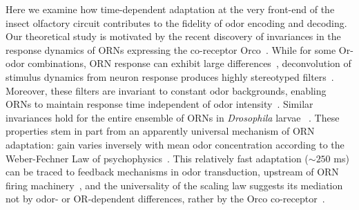 \documentclass[9pt,twocolumn,twoside,lineno]{pnas-new}
\begin{document}
Here we examine how time-dependent adaptation at the very front-end of the insect olfactory circuit contributes to the fidelity of odor encoding and decoding. Our theoretical study is motivated by the recent discovery of invariances in the response dynamics of ORNs expressing the co-receptor Orco~\cite{Orco, srinivas_elife, cafaro_WL, cao_WL}. While for some Or-odor combinations, ORN response can exhibit large differences~\cite{montague2011similar}, deconvolution of stimulus dynamics from neuron response produces highly stereotyped filters~\cite{martelli}. Moreover, these filters are invariant to constant odor backgrounds, enabling ORNs to maintain response time independent of odor intensity~\cite{martelli,srinivas_elife}. Similar invariances hold for the entire ensemble of ORNs in \textit{Drosophila} larvae ~\cite{si2017invariances}. These properties stem in part from an apparently universal mechanism of ORN adaptation: gain varies inversely with mean odor concentration according to the Weber-Fechner Law of psychophysics~\cite{weber1996eh,fechner2012elemente,srinivas_elife,cafaro_WL,cao_WL}. This relatively fast adaptation ($\sim 250$ ms) can be traced to feedback mechanisms in odor transduction, upstream of ORN firing machinery~\cite{nagel_wilson_biophysical,cao_WL,cafaro_WL,srinivas_elife}, and the universality of the scaling law suggests its mediation not by odor- or OR-dependent differences, rather by the Orco co-receptor~\cite{Orco,getahun2013insect,getahun2016intracellular}. %
\end{document}
